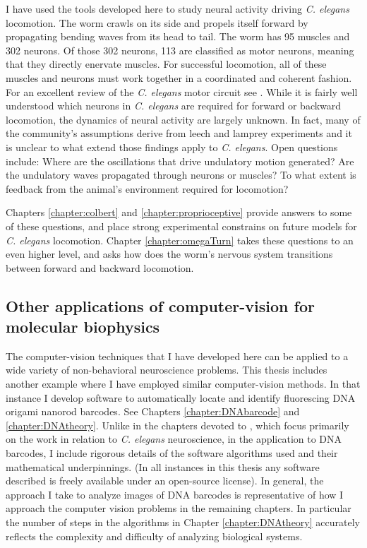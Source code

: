 I have used the tools developed here to study neural activity driving \emph{C. elegans} locomotion. The worm crawls on its side and propels itself forward by propagating bending waves from its head to tail.  The worm has 95 muscles and 302 neurons. Of those 302 neurons, 113 are classified as motor neurons, meaning that they directly enervate muscles. For successful locomotion, all of these muscles and neurons must work together in a coordinated and coherent fashion. For an excellent review of the \textit{C. elegans}  motor circuit see \citep{von_stetina_motor_2006}. While it is fairly well understood which neurons  in \textit{C. elegans} are required for forward or backward locomotion, the dynamics of neural activity are largely unknown. In fact, many of the community's assumptions derive from leech and lamprey experiments \citep{friesen_sensory_2001, karbowski_systems_2008} and it is unclear to what extend those findings apply to \textit{C. elegans}. Open questions include: Where are the oscillations that drive undulatory motion generated? Are the undulatory waves propagated through neurons or muscles? To what extent is  feedback from the animal's environment required for locomotion? 

Chapters \ref{chapter:colbert} and \ref{chapter:proprioceptive} provide answers to some of these questions, and place strong experimental constrains on future models for \textit{C. elegans} locomotion.  Chapter \ref{chapter:omegaTurn} takes these questions to an even higher level, and asks how does the worm's nervous system transitions between forward and backward locomotion. 



\subsection{Other applications of computer-vision for molecular biophysics}
The computer-vision techniques that I have developed here can be applied to a wide variety of non-behavioral neuroscience problems. This thesis includes another example where I have employed similar computer-vision methods. In that instance I develop software to automatically locate and identify fluorescing DNA origami nanorod barcodes. See Chapters \ref{chapter:DNAbarcode} and \ref{chapter:DNAtheory}. Unlike in the chapters devoted to , which focus primarily on the work in relation to \textit{C. elegans} neuroscience, in the  application to DNA barcodes, I include rigorous details of the software algorithms used and their mathematical underpinnings. (In all instances in this thesis any software described is freely available under an open-source license).   In general, the approach I take to analyze images of DNA barcodes is representative of how I approach the computer vision problems in the remaining chapters. In particular the number of steps in the algorithms in Chapter \ref{chapter:DNAtheory} accurately reflects the complexity and difficulty of analyzing biological systems. 


